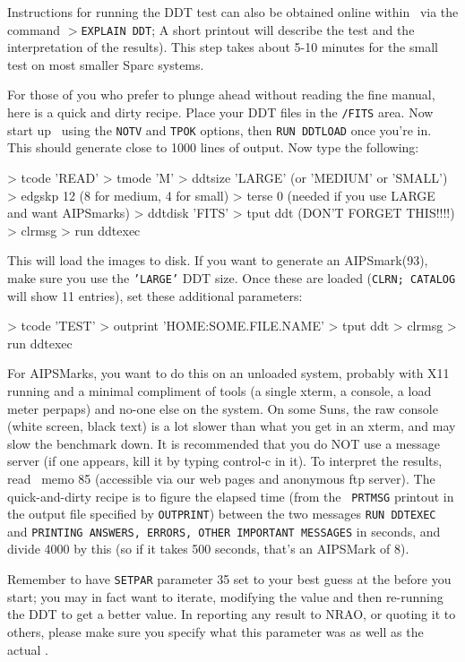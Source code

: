 Instructions for running the DDT test can also be obtained online within
\ttaips\ via the command $>${\tt EXPLAIN DDT}; A short printout will
describe the test and the interpretation of the results).  This step
takes about 5-10 minutes for the small test on most smaller Sparc
systems.

For those of you who prefer to plunge ahead without reading the fine
manual, here is a quick and dirty recipe.  Place your DDT files in the
{\tt\AROOT /FITS} area.  Now start up \ttaips\ using the {\tt NOTV} and
{\tt TPOK} options, then {\tt RUN DDTLOAD} once you're in.  This should
generate close to 1000 lines of output.  Now type the following:
\medskip
\vfill\eject %

\fortran
  > tcode 'READ'
  > tmode 'M'
  > ddtsize 'LARGE'     (or 'MEDIUM' or 'SMALL')
  > edgskp 12           (8 for medium, 4 for small)
  > terse 0             (needed if you use LARGE and want AIPSmarks)
  > ddtdisk 'FITS'
  > tput ddt            (DON'T FORGET THIS!!!!)
  > clrmsg
  > run ddtexec
\endfortran
\medskip

\noindent This will load the images to disk.  If you want to generate an
AIPSmark(93), make sure you use the {\tt 'LARGE'} DDT size.  Once these
are loaded ({\tt CLRN; CATALOG} will show 11 entries), set these
additional parameters:\medskip

\fortran
  > tcode 'TEST'
  > outprint 'HOME:SOME.FILE.NAME'
  > tput ddt
  > clrmsg
  > run ddtexec
\endfortran
\medskip

\noindent For AIPSMarks, you want to do this on an unloaded system,
probably with X11 running and a minimal compliment of tools (a single
xterm, a console, a load meter perpaps) and no-one else on the system.
On some Suns, the raw console (white screen, black text) is a lot slower
than what you get in an xterm, and may slow the benchmark down.  It is
recommended that you do NOT use a message server (if one appears, kill
it by typing control-c in it).  To interpret the results, read
\AIPS\ memo 85 (accessible via our web pages and anonymous ftp server).
The quick-and-dirty recipe is to figure the elapsed time (from the {\tt
PRTMSG} printout in the output file specified by {\tt OUTPRINT}) between
the two messages {\tt RUN DDTEXEC} and {\tt PRINTING ANSWERS, ERRORS,
OTHER IMPORTANT MESSAGES} in seconds, and divide 4000 by this (so if it
takes 500 seconds, that's an AIPSMark of 8).

Remember to have {\tt SETPAR} parameter 35 set to your best guess at the
 before you start; you may in fact want to iterate,
modifying the value and then re-running the DDT to get a better value.
In reporting any result to NRAO, or quoting it to others, please make
sure you specify what this parameter was as well as the actual
.

